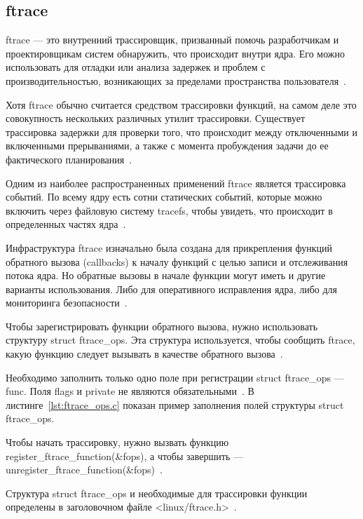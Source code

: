 \documentclass{bmstu}
\begin{document}
\subsection{ftrace}

ftrace --- это внутренний трассировщик, призванный помочь разработчикам и проектировщикам систем обнаружить, что происходит внутри ядра. 
Его можно использовать для отладки или анализа задержек и проблем с производительностью, возникающих за пределами пространства пользователя~\cite{Ftrace}.

Хотя ftrace обычно считается средством трассировки функций, на самом деле это совокупность нескольких различных утилит трассировки. 
Существует трассировка задержки для проверки того, что происходит между отключенными и включенными прерываниями, а также с момента пробуждения задачи до ее фактического планирования~\cite{Ftrace}.

Одним из наиболее распространенных применений ftrace является трассировка событий. 
По всему ядру есть сотни статических событий, которые можно включить через файловую систему tracefs, чтобы увидеть, что происходит в определенных частях ядра~\cite{Ftrace}.

Инфраструктура ftrace изначально была создана для прикрепления функций обратного вызова (callbacks) к началу функций с целью записи и отслеживания потока ядра. 
Но обратные вызовы в начале функции могут иметь и другие варианты использования. 
Либо для оперативного исправления ядра, либо для мониторинга безопасности~\cite{Ftrace}.

Чтобы зарегистрировать функции обратного вызова, нужно использовать структуру struct ftrace\_ops. 
Эта структура используется, чтобы сообщить ftrace, какую функцию следует вызывать в качестве обратного вызова~\cite{Ftrace}.

Необходимо заполнить только одно поле при регистрации struct ftrace\_ops --- func. 
Поля flags и private не являются обязательными~\cite{Ftrace}. 
В листинге~\ref{lst:ftrace_ops.c} показан пример заполнения полей структуры struct ftrace\_ops.


Чтобы начать трассировку, нужно вызвать функцию register\_ftrace\_function(\&fops), а чтобы завершить --- unregister\_ftrace\_function(\&fops)~\cite{Ftrace}.

Структура struct ftrace\_ops и необходимые для трассировки функции определены в заголовочном файле <linux/ftrace.h>~\cite{Ftrace}.
\end{document}

